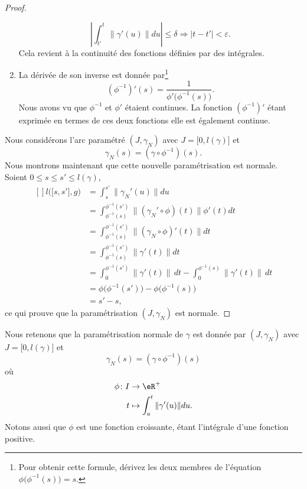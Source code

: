 \begin{proof}
\begin{enumerate}
\begin{equation}
            |   \int_{t'}^t\big\| \gamma'(u) \big\|du  |\leq\delta\Rightarrow | t-t' |<\varepsilon.
        \end{equation}
        Cela revient à la continuité des fonctions définies par des intégrales.
    \item 
        La dérivée de son inverse est donnée par\footnote{Pour obtenir cette formule, dérivez les deux membres de l'équation $\phi\big( \phi^{-1}(s) \big)=s$.} 
        \begin{equation}
            (\phi^{-1})'(s)=\frac{1}{\phi'\big( \phi^{-1}(s) \big)}.
        \end{equation}
        Nous avons vu que $\phi^{-1}$ et $\phi'$ étaient continues. La fonction $(\phi^{-1})'$ étant exprimée en termes de ces deux fonctions elle est également continue.
\end{enumerate}

Nous considérons l'arc paramétré $(J,\gamma_N)$ avec $J=\mathopen[ 0 , l(\gamma) \mathclose]$ et 
\begin{equation}
    \gamma_N(s)=(\gamma\circ\phi^{-1})(s).
\end{equation}
Nous montrons maintenant que cette nouvelle paramétrisation est normale. Soient $0\leq s\leq s'\leq l(\gamma)$,
\begin{equation}
    \begin{aligned}[]
        l\big( \mathopen[ s , s' \mathclose],g \big)&=\int_s^{s'}\big\| \gamma_N'(u) \big\|du\\
        &=\int_{\phi^{-1}(s)}^{\phi^{-1}(s')}\big\| (\gamma_N'\circ\phi)(t) \big\|\phi'(t)dt\\
        &=\int_{\phi^{-1}(s)}^{\phi^{-1}(s')}\big\| (\gamma_N\circ\phi)'(t) \big\|dt\\
        &=\int_{\phi^{-1}(s)}^{\phi^{-1}(s')}\big\| \gamma'(t) \big\|dt\\
        &=\int_{0}^{\phi^{-1}(s')}\big\| \gamma'(t) \big\|\,dt -\int_0^{\phi^{-1}(s)}\big\| \gamma'(t) \big\|\,dt \\
        &=\phi\big( \phi^{-1}(s') \big)-\phi\big( \phi^{-1}(s) \big)\\
        &=s'-s,
    \end{aligned}
\end{equation}
ce qui prouve que la paramétrisation $(J,\gamma_N)$ est normale.
\end{proof}

Nous retenons que la paramétrisation normale de $\gamma$ est donnée par $(J,\gamma_N)$ avec $J=\mathopen[ 0 , l(\gamma) \mathclose]$ et 
\begin{equation}        \label{EqFomVPcogammaN}
\gamma_N(s)=(\gamma\circ\phi^{-1})(s)
\end{equation}
où
\begin{equation}        \label{EqFomVPcoordnorm}
\begin{aligned}
    \phi\colon I&\to \eR^+ \\
    t&\mapsto \int_a^t\| \gamma'(u) \|du. 
\end{aligned}
\end{equation}
Notons aussi que $\phi$ est une fonction croissante, étant l'intégrale d'une fonction positive.

